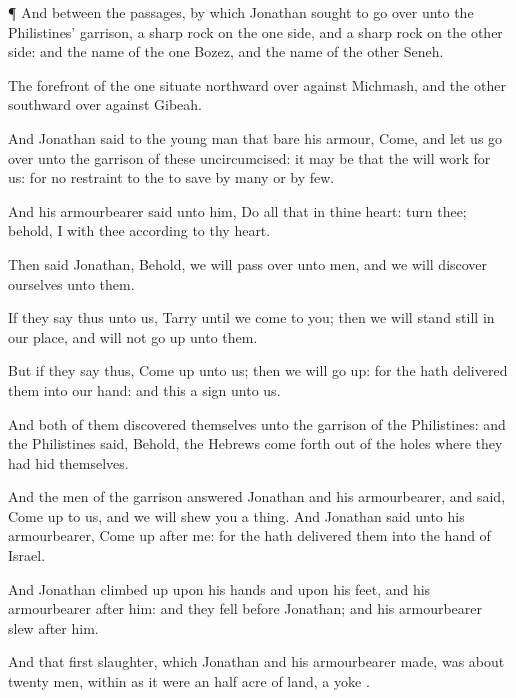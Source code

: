 {\par }{\PP {}¶ And between the
passages, by which
Jonathan
sought to go
over unto the
Philistines’
garrison,
{} a
sharp
rock on the one
side, and a
sharp
rock on the other
side: and the
name of the
one
{}
Bozez, and the
name of the
other
Seneh.

The
forefront of the
one
{}
situate
northward over
against
Michmash, and the
other
southward over
against
Gibeah.

And
Jonathan
said to the young
man that
bare his
armour,
Come, and let us go
over unto the
garrison of these
uncircumcised: it may be that the
{} will
work for us: for
{} no
restraint to the
{} to
save by
many or by
few.

And his
armourbearer
said unto him,
Do all that
{} in thine
heart:
turn thee; behold, I
{} with thee according to thy
heart.

Then
said
Jonathan, Behold, we will pass
over unto
{}
men, and we will
discover ourselves unto them.

If they
say thus unto us,
Tarry until we
come to you; then we will stand
still in our place, and will not go
up unto them.

But if they
say thus, Come
up unto us; then we will go
up: for the
{} hath
delivered them into our
hand: and this
{} a
sign unto us.

And
both of them
discovered themselves unto the
garrison of the
Philistines: and the
Philistines
said, Behold, the
Hebrews come
forth out of the
holes where they had
hid themselves.

And the
men of the
garrison
answered
Jonathan and his
armourbearer, and
said, Come
up to us, and we will
shew you a
thing. And
Jonathan
said unto his
armourbearer, Come
up
after me: for the
{} hath
delivered them into the
hand of
Israel.

And
Jonathan climbed
up upon his
hands and upon his
feet, and his
armourbearer
after him: and they
fell
before
Jonathan; and his
armourbearer
slew
after him.

And that
first
slaughter, which
Jonathan and his
armourbearer
made, was about
twenty
men, within as it were an
half
acre of
land,
{} a
yoke
{}.

}
